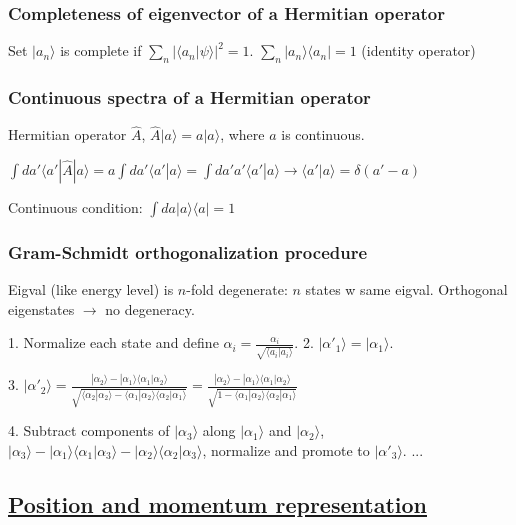 \subsubsection{Completeness of eigenvector of a Hermitian operator}
Set $|a_n \rangle$ is complete if $\sum_n |\langle a_n | \psi \rangle|^2 = 1$.
$\sum_n |a_n \rangle \langle a_n | = 1$ (identity operator)

\subsubsection{Continuous spectra of a Hermitian operator}

Hermitian operator $\widehat{A}$, $\widehat{A} | a \rangle = a | a \rangle$, where $a$ is continuous. 

$\int da' \langle a' | \widehat{A} | a \rangle = a \int da' \langle a' | a \rangle = \int da' a' \langle a' | a \rangle \rightarrow \langle a' | a \rangle = \delta (a' - a)$

Continuous condition: $\int da | a \rangle \langle a | = 1$

\subsubsection{Gram-Schmidt orthogonalization procedure}

Eigval (like energy level) is $n$-fold degenerate: $n$ states w same eigval.
Orthogonal eigenstates $\rightarrow$ no degeneracy.

1. Normalize each state and define $\alpha_i = \frac{\alpha_i}{\sqrt{\langle a_i | a_i \rangle}}$. 2. $|\alpha'_1 \rangle = | \alpha_1 \rangle$.

3. $|\alpha'_2 \rangle = \frac{|\alpha_2 \rangle - |\alpha_1 \rangle \langle \alpha_1 | \alpha_2 \rangle}{\sqrt{\langle \alpha_2 | \alpha_2 \rangle - \langle \alpha_1 | \alpha_2 \rangle \langle \alpha_2 | \alpha_1 \rangle}} = \frac{|\alpha_2 \rangle - |\alpha_1 \rangle \langle \alpha_1 | \alpha_2 \rangle}{\sqrt{1 - \langle \alpha_1 | \alpha_2 \rangle \langle \alpha_2 | \alpha_1 \rangle}}$

4. Subtract components of $|\alpha_3 \rangle$ along $|\alpha_1 \rangle$ and $|\alpha_2 \rangle$, $|\alpha_3 \rangle - |\alpha_1 \rangle \langle \alpha_1 | \alpha_3 \rangle - | \alpha_2 \rangle \langle \alpha_2 | \alpha_3 \rangle$, normalize and promote to $|\alpha'_3 \rangle$.
...

\subsection{\underline{Position and momentum representation}}

